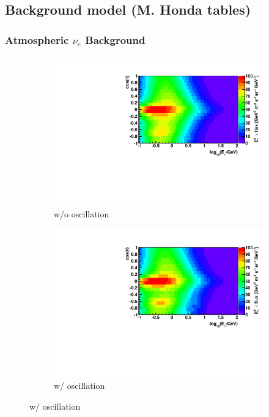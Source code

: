 \documentclass{beamer}
\begin{document}
\subsection{Background model (M. Honda tables)}
\begin{frame}
	\frametitle{Atmospheric $\nu_{e}$ Background}
	\begin{figure}
		\centering
		\begin{subfigure}[b]{0.49\linewidth}
			\caption*{ w/o oscillation }
			\includegraphics[width=\linewidth]{atm_nue_hist.pdf}
		\end{subfigure}
		\begin{subfigure}[b]{0.49\linewidth}
			\caption*{ w/ oscillation }
			\includegraphics[width=\linewidth]{atm_nue_osc_hist.pdf}
		\end{subfigure}
	\end{figure}
\end{frame}
\end{document}
